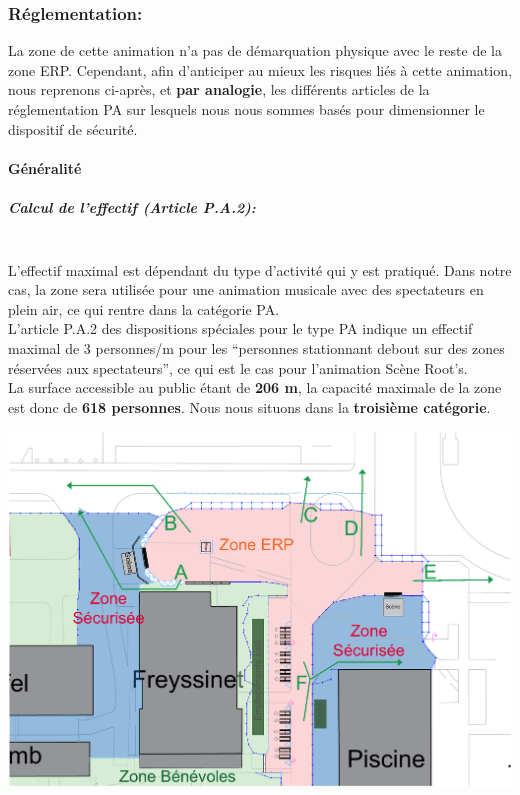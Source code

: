 \documentclass[hidelinks, paper=a4, fontsize=13pt]{report}
\begin{document}
\subsubsection{Réglementation:}
La zone de cette animation n'a pas de démarquation physique avec le reste de la zone ERP. Cependant, afin d’anticiper au mieux les risques liés à cette animation, nous reprenons ci-après, et \textbf{par analogie}, les différents articles de la réglementation PA sur lesquels nous nous sommes basés pour dimensionner le dispositif de sécurité. 

\newpage

\paragraph{Généralité}
\subparagraph*{Calcul de l'effectif (Article P.A.2):}\mbox{}\\
L’effectif maximal est dépendant du type d’activité qui y est pratiqué. Dans notre cas, la zone sera utilisée pour une animation musicale avec des spectateurs en plein air, ce qui rentre dans la catégorie PA. \\

L’article P.A.2 des dispositions spéciales pour le type PA indique un effectif maximal de 3 personnes/m  pour les “personnes stationnant debout sur des zones réservées aux spectateurs”, ce qui est le cas pour l’animation Scène Root's. \\

La surface accessible au public étant de \textbf{206 m}, la capacité maximale de la zone est donc de \textbf{618 personnes}. Nous nous situons dans la \textbf{troisième catégorie}. \\



\begin{center}
	\includegraphics[width=.75\textwidth,keepaspectratio]{Exports/Plan_24h_44eme-3e_Scene_Circ_Autour}
\end{center}
\end{document}

